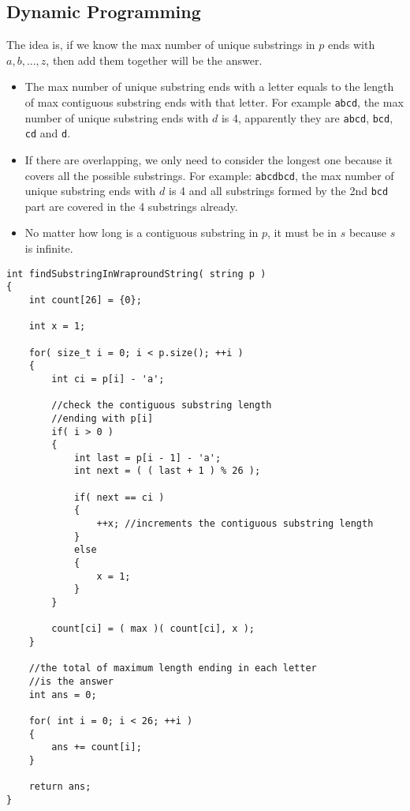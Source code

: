 \subsection{Dynamic Programming}
The idea is, if we know the max number of unique substrings in $p$ ends with $a, b, \ldots, z$, then add them together will be the answer. 

\begin{itemize}
\item The max number of unique substring ends with a letter equals to the length of max contiguous substring ends with that letter. For example \texttt{abcd}, the max number of unique substring ends with $d$ is 4, apparently they are \texttt{abcd}, \texttt{bcd}, \texttt{cd} and \texttt{d}.
\item If there are overlapping, we only need to consider the longest one because it covers all the possible substrings. For example: \texttt{abcdbcd}, the max number of unique substring ends with $d$ is 4 and all substrings formed by the 2nd \texttt{bcd} part are covered in the 4 substrings already.
\item No matter how long is a contiguous substring in $p$, it must be in $s$ because $s$ is infinite.
\end{itemize}

\setcounter{lstlisting}{0}
\begin{lstlisting}[style=customc, caption={Dynamic Programming}]
int findSubstringInWraproundString( string p )
{
    int count[26] = {0};

    int x = 1;

    for( size_t i = 0; i < p.size(); ++i )
    {
        int ci = p[i] - 'a';

        //check the contiguous substring length
        //ending with p[i]
        if( i > 0 )
        {
            int last = p[i - 1] - 'a';
            int next = ( ( last + 1 ) % 26 );

            if( next == ci )
            {
                ++x; //increments the contiguous substring length
            }
            else
            {
                x = 1;
            }
        }

        count[ci] = ( max )( count[ci], x );
    }

    //the total of maximum length ending in each letter
    //is the answer
    int ans = 0;

    for( int i = 0; i < 26; ++i )
    {
        ans += count[i];
    }

    return ans;
}
\end{lstlisting}